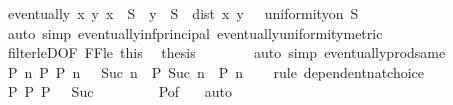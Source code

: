 \begin{isabellebody}
\ {\isachardoublequoteopen}eventually\ {\isacharparenleft}{\kern0pt}{\isasymlambda}{\isacharparenleft}{\kern0pt}x{\isacharcomma}{\kern0pt}\ y{\isacharparenright}{\kern0pt}{\isachardot}{\kern0pt}\ x\ {\isasymin}\ S\ {\isasymand}\ y\ {\isasymin}\ S\ {\isasymand}\ dist\ x\ y\ {\isacharless}{\kern0pt}\ {\isasymepsilon}{\isacharparenright}{\kern0pt}\ {\isacharparenleft}{\kern0pt}uniformity{\isacharunderscore}{\kern0pt}on\ S{\isacharparenright}{\kern0pt}{\isachardoublequoteclose}\isanewline
\ \ \ \ \ \ \isamarkupfalse%
\ {\isacharparenleft}{\kern0pt}auto\ simp{\isacharcolon}{\kern0pt}\ eventually{\isacharunderscore}{\kern0pt}inf{\isacharunderscore}{\kern0pt}principal\ eventually{\isacharunderscore}{\kern0pt}uniformity{\isacharunderscore}{\kern0pt}metric{\isacharparenright}{\kern0pt}\isanewline
\ \ \ \ \isamarkupfalse%
\ filter{\isacharunderscore}{\kern0pt}leD{\isacharbrackleft}{\kern0pt}OF\ FF{\isacharunderscore}{\kern0pt}le\ this{\isacharbrackright}{\kern0pt}\ \isamarkupfalse%
\ {\isacharquery}{\kern0pt}thesis\isanewline
\ \ \ \ \ \ \isamarkupfalse%
\ {\isacharparenleft}{\kern0pt}auto\ simp{\isacharcolon}{\kern0pt}\ eventually{\isacharunderscore}{\kern0pt}prod{\isacharunderscore}{\kern0pt}same{\isacharparenright}{\kern0pt}\isanewline
\ \ \isamarkupfalse%
\isanewline
\isanewline
\ \ \isamarkupfalse%
\ {\isachardoublequoteopen}{\isasymexists}P{\isachardot}{\kern0pt}\ {\isasymforall}n{\isachardot}{\kern0pt}\ {\isacharquery}{\kern0pt}P\ {\isacharparenleft}{\kern0pt}P\ n{\isacharparenright}{\kern0pt}\ {\isacharparenleft}{\kern0pt}{}\ {\isacharslash}{\kern0pt}\ Suc\ n{\isacharparenright}{\kern0pt}\ {\isasymand}\ P\ {\isacharparenleft}{\kern0pt}Suc\ n{\isacharparenright}{\kern0pt}\ {\isasymle}\ P\ n{\isachardoublequoteclose}\isanewline
\ \ \isamarkupfalse%
\ {\isacharparenleft}{\kern0pt}rule\ dependent{\isacharunderscore}{\kern0pt}nat{\isacharunderscore}{\kern0pt}choice{\isacharparenright}{\kern0pt}\isanewline
\ \ \ \ \isamarkupfalse%
\ {\isachardoublequoteopen}{\isasymexists}P{\isachardot}{\kern0pt}\ {\isacharquery}{\kern0pt}P\ P\ {\isacharparenleft}{\kern0pt}{}\ {\isacharslash}{\kern0pt}\ Suc\ {}{\isacharparenright}{\kern0pt}{\isachardoublequoteclose}\isanewline
\ \ \ \ \ \ \isamarkupfalse%
\ P{\isacharbrackleft}{\kern0pt}of\ {}{\isacharbrackright}{\kern0pt}\ \isamarkupfalse%
\ auto\isanewline
\ \ \isamarkupfalse%
\isanewline
\ \ \ \ \isamarkupfalse%

\end{isabellebody}
